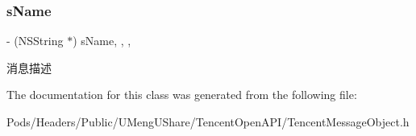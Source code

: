 \subsubsection{\texorpdfstring{s\+Name}{sName}}
{\footnotesize\ttfamily -\/ (N\+S\+String $\ast$) s\+Name\hspace{0.3cm}{\ttfamily [read]}, {\ttfamily [write]}, {\ttfamily [nonatomic]}, {\ttfamily [retain]}}

消息描述 

The documentation for this class was generated from the following file\+:\begin{DoxyCompactItemize}
\item 
Pods/\+Headers/\+Public/\+U\+Meng\+U\+Share/\+Tencent\+Open\+A\+P\+I/Tencent\+Message\+Object.\+h\end{DoxyCompactItemize}
